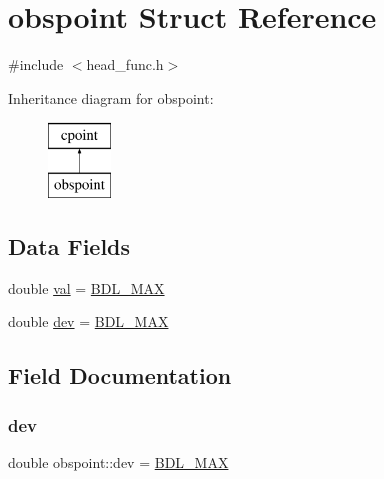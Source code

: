 \hypertarget{structobspoint}{}\section{obspoint Struct Reference}
\label{structobspoint}


{\ttfamily \#include $<$head\+\_\+func.\+h$>$}

Inheritance diagram for obspoint\+:\begin{figure}[H]
\begin{center}
\leavevmode
\includegraphics[height=2.000000cm]{structobspoint}
\end{center}
\end{figure}
\subsection*{Data Fields}
\begin{DoxyCompactItemize}
\item 
double \mbox{\hyperlink{structobspoint_aae6d924171c2a4e8aecd2899577f8033}{val}} = \mbox{\hyperlink{head__func_8h_a171f39ecf5d0b8067fd66e19e82f334d}{B\+D\+L\+\_\+\+M\+AX}}
\item 
double \mbox{\hyperlink{structobspoint_aede48d7173da7fbe888d6cab7a0a9f32}{dev}} = \mbox{\hyperlink{head__func_8h_a171f39ecf5d0b8067fd66e19e82f334d}{B\+D\+L\+\_\+\+M\+AX}}
\end{DoxyCompactItemize}


\subsection{Field Documentation}
\mbox{\label{structobspoint_aede48d7173da7fbe888d6cab7a0a9f32}} 
\subsubsection{\texorpdfstring{dev}{dev}}
{\footnotesize\ttfamily double obspoint\+::dev = \mbox{\hyperlink{head__func_8h_a171f39ecf5d0b8067fd66e19e82f334d}{B\+D\+L\+\_\+\+M\+AX}}}

\mbox{\label{structobspoint_aae6d924171c2a4e8aecd2899577f8033}} 
